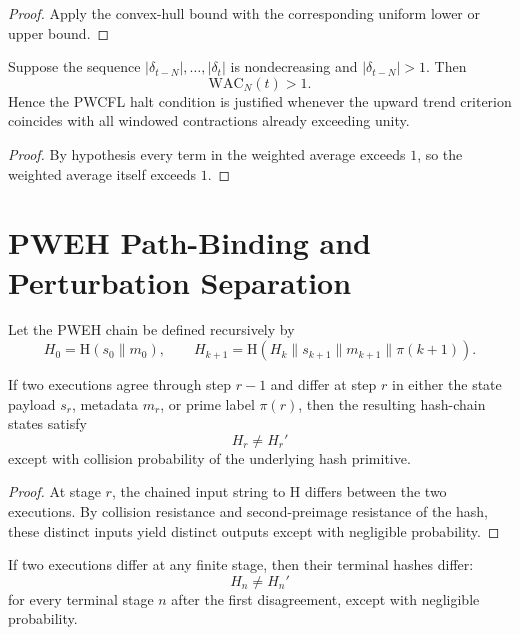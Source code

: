 \documentclass[12pt,a4paper]{article}
\theoremstyle{definition}
\theoremstyle{plain}
\theoremstyle{remark}
\begin{document}
\begin{proof}
Apply the convex-hull bound with the corresponding uniform lower or upper bound.
\end{proof}

\begin{proposition}
Suppose the sequence $|\delta_{t-N}|,\dots,|\delta_t|$ is nondecreasing and
$|\delta_{t-N}|>1$. Then
\begin{equation}
\mathrm{WAC}_N(t) > 1.
\end{equation}
Hence the PWCFL halt condition is justified whenever the upward trend criterion
coincides with all windowed contractions already exceeding unity.
\end{proposition}

\begin{proof}
By hypothesis every term in the weighted average exceeds $1$, so the weighted
average itself exceeds $1$.
\end{proof}

\section{PWEH Path-Binding and Perturbation Separation}

Let the PWEH chain be defined recursively by
\begin{equation}
H_0 = \mathrm{H}(s_0\|m_0),
\qquad
H_{k+1} = \mathrm{H}(H_k\|s_{k+1}\|m_{k+1}\|\pi(k+1)).
\end{equation}

\begin{proposition}
If two executions agree through step $r-1$ and differ at step $r$ in either the
state payload $s_r$, metadata $m_r$, or prime label $\pi(r)$, then the resulting
hash-chain states satisfy
\begin{equation}
H_r \neq H_r'
\end{equation}
except with collision probability of the underlying hash primitive.
\end{proposition}

\begin{proof}
At stage $r$, the chained input string to $\mathrm{H}$ differs between the two
executions. By collision resistance and second-preimage resistance of the hash,
these distinct inputs yield distinct outputs except with negligible probability.
\end{proof}

\begin{corollary}
If two executions differ at any finite stage, then their terminal hashes differ:
\begin{equation}
H_n \neq H_n'
\end{equation}
for every terminal stage $n$ after the first disagreement, except with negligible
probability.
\end{corollary}
\end{document}
